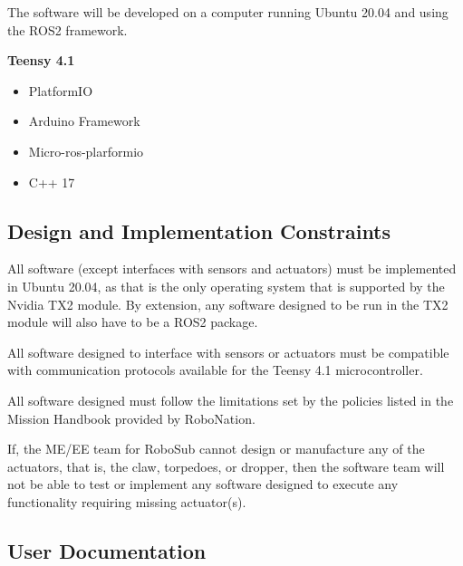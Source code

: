 The software will be developed on a computer running Ubuntu 20.04 and using the
ROS2 framework.
\par

\textbf{Teensy 4.1}
\begin{itemize}
    \item PlatformIO
    \item Arduino Framework
    \item Micro-ros-plarformio
    \item C++ 17
\end{itemize}

\subsection{Design and Implementation Constraints}
\label{sec:constraints}

All software (except interfaces with sensors and actuators) must be implemented
in Ubuntu 20.04, as that is the only operating system that is supported by the
Nvidia TX2 module. By extension, any software designed to be run in the TX2
module will also have to be a ROS2 package. 
\par

All software designed to interface with sensors or actuators must be compatible
with communication protocols available for the Teensy 4.1 microcontroller. 
\par

All software designed must follow the limitations set by the policies listed in
the Mission Handbook provided by RoboNation. 
\par

If, the ME/EE team for RoboSub cannot design or manufacture any of the
actuators, that is, the claw, torpedoes, or dropper, then the software team
will not be able to test or implement any software designed to execute any
functionality requiring missing actuator(s).
\par

\subsection{User Documentation}
\label{sec:documentation}

